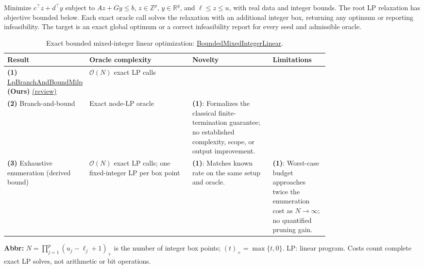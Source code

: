\begin{table}[tp]
\centering
\caption{Exact bounded mixed-integer linear optimization: \href{https://github.com/k3nfalt/longtails/blob/main/LongTails/Setups/BoundedMixedIntegerLinear.lean}{BoundedMixedIntegerLinear}.}\label{tab:BoundedMixedIntegerLinear}
\parbox{\linewidth}{\footnotesize Minimize $c^\top z+d^\top y$ subject to $Az+Gy\le b$, $z\in\mathbb Z^p$, $y\in\mathbb R^q$, and $\ell\le z\le u$, with real data and integer bounds. The root LP relaxation has objective bounded below. Each exact oracle call solves the relaxation with an additional integer box, returning any optimum or reporting infeasibility. The target is an exact global optimum or a correct infeasibility report for every seed and admissible oracle.}\par\smallskip
\begin{threeparttable}
\footnotesize
\setlength{\tabcolsep}{4pt}\renewcommand{\arraystretch}{1.25}
\begin{tabularx}{\linewidth}{@{}>{\raggedright\arraybackslash}p{0.20\linewidth}>{\raggedright\arraybackslash}p{0.32\linewidth}>{\raggedright\arraybackslash}p{0.25\linewidth}>{\raggedright\arraybackslash}X@{}}
\toprule
\textbf{Result} & \textbf{Oracle complexity} & \textbf{Novelty} & \textbf{Limitations} \\
\midrule
\textbf{(1)} \href{https://github.com/k3nfalt/longtails/blob/main/LongTails/Theorems/LpBranchAndBoundMilp.lean}{Lp\allowbreak Branch\allowbreak And\allowbreak Bound\allowbreak Milp} \textbf{(Ours)} \href{https://github.com/k3nfalt/longtails/blob/main/scripts/reviews/LpBranchAndBoundMilp.md}{(review)} & $\mathcal{O}(N)$ exact LP calls & & \\
\midrule[1.2pt]
\textbf{(2)} Branch-and-bound \citep{bmilpCCZ2014} & Exact node-LP oracle & \textbf{(1)}: Formalizes the classical finite-termination guarantee; no established complexity, scope, or output improvement. & \\
\midrule
\textbf{(3)} Exhaustive enumeration (derived bound) \citep{bmilpCCZ2014} & $\mathcal{O}(N)$ exact LP calls; one fixed-integer LP per box point & \textbf{(1)}: Matches known rate on the same setup and oracle. & \textbf{(1)}: Worst-case budget approaches twice the enumeration cost as $N\to\infty$; no quantified pruning gain. \\
\bottomrule
\end{tabularx}
\begin{tablenotes}[flushleft]\footnotesize
\item[] \textbf{Abbr:} $N=\prod_{j=1}^{p}(u_j-\ell_j+1)_+$ is the number of integer box points; $(t)_+=\max\{t,0\}$. LP: linear program. Costs count complete exact LP solves, not arithmetic or bit operations.
\end{tablenotes}
\end{threeparttable}
\end{table}
\clearpage
